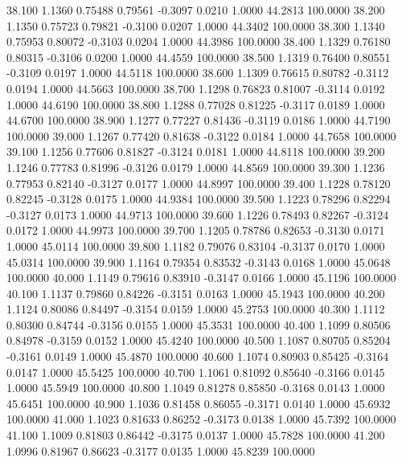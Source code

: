   38.100   1.1360   0.75488   0.79561  -0.3097   0.0210   1.0000  44.2813 100.0000
  38.200   1.1350   0.75723   0.79821  -0.3100   0.0207   1.0000  44.3402 100.0000
  38.300   1.1340   0.75953   0.80072  -0.3103   0.0204   1.0000  44.3986 100.0000
  38.400   1.1329   0.76180   0.80315  -0.3106   0.0200   1.0000  44.4559 100.0000
  38.500   1.1319   0.76400   0.80551  -0.3109   0.0197   1.0000  44.5118 100.0000
  38.600   1.1309   0.76615   0.80782  -0.3112   0.0194   1.0000  44.5663 100.0000
  38.700   1.1298   0.76823   0.81007  -0.3114   0.0192   1.0000  44.6190 100.0000
  38.800   1.1288   0.77028   0.81225  -0.3117   0.0189   1.0000  44.6700 100.0000
  38.900   1.1277   0.77227   0.81436  -0.3119   0.0186   1.0000  44.7190 100.0000
  39.000   1.1267   0.77420   0.81638  -0.3122   0.0184   1.0000  44.7658 100.0000
  39.100   1.1256   0.77606   0.81827  -0.3124   0.0181   1.0000  44.8118 100.0000
  39.200   1.1246   0.77783   0.81996  -0.3126   0.0179   1.0000  44.8569 100.0000
  39.300   1.1236   0.77953   0.82140  -0.3127   0.0177   1.0000  44.8997 100.0000
  39.400   1.1228   0.78120   0.82245  -0.3128   0.0175   1.0000  44.9384 100.0000
  39.500   1.1223   0.78296   0.82294  -0.3127   0.0173   1.0000  44.9713 100.0000
  39.600   1.1226   0.78493   0.82267  -0.3124   0.0172   1.0000  44.9973 100.0000
  39.700   1.1205   0.78786   0.82653  -0.3130   0.0171   1.0000  45.0114 100.0000
  39.800   1.1182   0.79076   0.83104  -0.3137   0.0170   1.0000  45.0314 100.0000
  39.900   1.1164   0.79354   0.83532  -0.3143   0.0168   1.0000  45.0648 100.0000
  40.000   1.1149   0.79616   0.83910  -0.3147   0.0166   1.0000  45.1196 100.0000
  40.100   1.1137   0.79860   0.84226  -0.3151   0.0163   1.0000  45.1943 100.0000
  40.200   1.1124   0.80086   0.84497  -0.3154   0.0159   1.0000  45.2753 100.0000
  40.300   1.1112   0.80300   0.84744  -0.3156   0.0155   1.0000  45.3531 100.0000
  40.400   1.1099   0.80506   0.84978  -0.3159   0.0152   1.0000  45.4240 100.0000
  40.500   1.1087   0.80705   0.85204  -0.3161   0.0149   1.0000  45.4870 100.0000
  40.600   1.1074   0.80903   0.85425  -0.3164   0.0147   1.0000  45.5425 100.0000
  40.700   1.1061   0.81092   0.85640  -0.3166   0.0145   1.0000  45.5949 100.0000
  40.800   1.1049   0.81278   0.85850  -0.3168   0.0143   1.0000  45.6451 100.0000
  40.900   1.1036   0.81458   0.86055  -0.3171   0.0140   1.0000  45.6932 100.0000
  41.000   1.1023   0.81633   0.86252  -0.3173   0.0138   1.0000  45.7392 100.0000
  41.100   1.1009   0.81803   0.86442  -0.3175   0.0137   1.0000  45.7828 100.0000
  41.200   1.0996   0.81967   0.86623  -0.3177   0.0135   1.0000  45.8239 100.0000
